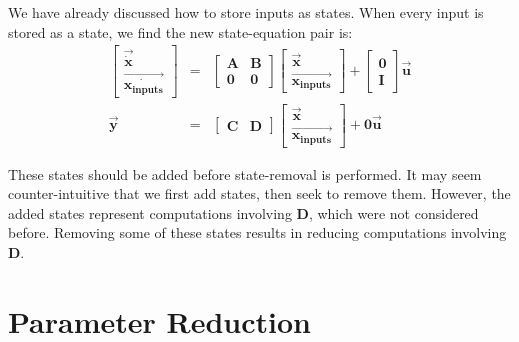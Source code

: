     We have already discussed how to store inputs as states. When
every input is stored as a state, we find the new state-equation
pair is:
\begin{eqnarray*}
\left [ \begin{array} {c} \vec{\dot{\mathbf{x}}} \\
\vec{\dot{\mathbf{x_{inputs}}}} \end{array} \right ] & = & \left [
\begin{array} {cc} \mathbf{A} & \mathbf{B} \\ \mathbf{0} &
\mathbf{0} \end{array} \right ] \left [ \begin{array} {c}
\vec{\mathbf{x}} \\ \vec{\mathbf{x_{inputs}}} \end{array} \right ]
+ \left [ \begin{array} {c} \mathbf{0} \\ \mathbf{I} \end{array}
\right ] \vec{\mathbf{u}} \\
\vec{\mathbf{y}} & = & \left [ \begin{array} {cc} \mathbf{C} &
\mathbf{D} \end{array} \right ] \left [ \begin{array} {c}
\vec{\mathbf{x}} \\ \vec{\mathbf{x_{inputs}}} \end{array} \right ]
+ \mathbf{0} \vec{\mathbf{u}}
\end{eqnarray*}

    These states should be added before state-removal is
performed. It may seem counter-intuitive that we first add states,
then seek to remove them. However, the added states represent
computations involving $\mathbf{D}$, which were not considered
before. Removing some of these states results in reducing
computations involving $\mathbf{D}$.

\section{Parameter Reduction}

